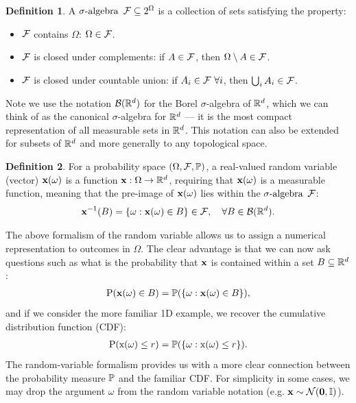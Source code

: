 \documentclass[a4paper,12pt,twoside,openright]{report}
\theoremstyle{definition}
\newtheorem{definition}{Definition}[section]
\begin{document}
\begin{definition}\label{def:sigma_algebra}
A $\sigalg$ $\calF \subseteq 2^{\Omega}$ is a collection of sets satisfying the property:
\begin{itemize}
    \item $\calF$ contains $\Omega$: $\Omega \in \calF$.
    \item $\calF$ is closed under complements: if $A\in\calF$, then $\Omega \setminus A \in \calF$.
    \item $\calF$ is closed under countable union:  if $A_i \in \calF \ \forall i$, then $\bigcup_i A_i \in \calF$.
\end{itemize}
\end{definition}

Note we use the notation $\calB(\R^d)$ for the Borel $\sigma$-algebra of $\R^d$, which we can think of as the canonical $\sigma$-algebra for $\R^d$ --- it is the most compact representation of all measurable sets in $\R^d$. This notation can also be extended for subsets of $\R^d$ and more generally to any topological space.

\begin{definition}\label{def:random_variable}
For a probability space $\probspace$, a real-valued random variable (vector) $\rvx(\omega)$ is a function $\rvx:\Omega \rightarrow \R^d$, requiring that $\rvx(\omega)$ is a measurable function, meaning that the pre-image of $\rvx(\omega)$  lies within the $\sigalg$ $\calF$:
\begin{align*}
    \rvx^{-1}(B)= \{\omega : \rvx(\omega) \in B \} \in \calF, \quad \forall B \in \calB(\R^d).
\end{align*}
\end{definition}
The above formalism of the random variable allows us to assign a numerical representation to outcomes in $\Omega$. The clear advantage is that we can now ask questions such as what is the probability that $\rvx$ is contained within a set $B \subseteq \R^d$:
\begin{align*}
     \text{P}(\rvx(\omega) \in B) = \P( \{\omega : \rvx(\omega) \in B \} ),
\end{align*}
 and if we consider the more familiar 1D example, we recover the cumulative distribution function (CDF):
 \begin{align*}
     \text{P}(\rx(\omega) \leq r) = \P( \{\omega : \rx(\omega) \leq r \} ).
 \end{align*}
 The random-variable formalism provides us with a more clear connection between the probability measure $\P$ and the familiar CDF. For simplicity in some cases, we may drop the argument $\omega$ from the random variable notation (e.g. $\rvx \sim \calN(\bm{0}, \mathbb{I})$). 
\end{document}
